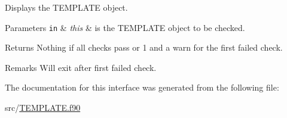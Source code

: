 Displays the T\+E\+M\+P\+L\+A\+TE object. 


\begin{DoxyParams}[1]{Parameters}
\mbox{\tt in}  & {\em this} & is the T\+E\+M\+P\+L\+A\+TE object to be checked. \\
\hline
\end{DoxyParams}
\begin{DoxyReturn}{Returns}
Nothing if all checks pass or 1 and a warn for the first failed check. 
\end{DoxyReturn}
\begin{DoxyRemark}{Remarks}
Will exit after first failed check. 
\end{DoxyRemark}


The documentation for this interface was generated from the following file\+:\begin{DoxyCompactItemize}
\item 
src/\hyperlink{_t_e_m_p_l_a_t_e_8f90}{T\+E\+M\+P\+L\+A\+T\+E.\+f90}\end{DoxyCompactItemize}
